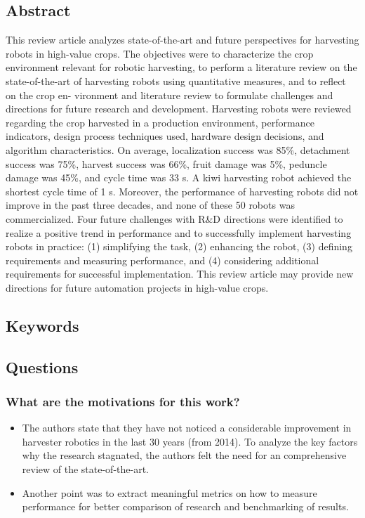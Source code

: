 \documentclass{article}
\begin{document}
\subsection*{Abstract}
This review article analyzes state-of-the-art and future perspectives for harvesting robots in high-value crops.
The objectives were to characterize the crop environment relevant for robotic harvesting, to perform a literature
review on the state-of-the-art of harvesting robots using quantitative measures, and to reflect on the crop en-
vironment and literature review to formulate challenges and directions for future research and development.
Harvesting robots were reviewed regarding the crop harvested in a production environment, performance indicators, design process techniques used, hardware design decisions, and algorithm characteristics. On average,
localization success was 85\%, detachment success was 75\%, harvest success was 66\%, fruit damage was 5\%,
peduncle damage was 45\%, and cycle time was 33 s. A kiwi harvesting robot achieved the shortest cycle time
of 1 s. Moreover, the performance of harvesting robots did not improve in the past three decades, and none
of these 50 robots was commercialized. Four future challenges with R\&D directions were identified to realize
a positive trend in performance and to successfully implement harvesting robots in practice: (1) simplifying
the task, (2) enhancing the robot, (3) defining requirements and measuring performance, and (4) considering
additional requirements for successful implementation. This review article may provide new directions for
future automation projects in high-value crops.
\subsection*{Keywords}

\subsection*{Questions}
\subsubsection*{What are the motivations for this work?}
\begin{itemize}
    \item The authors state that they have not noticed a considerable improvement in harvester robotics in the last 30 years (from 2014). To analyze the key factors why the research stagnated, the authors felt the need for an comprehensive review of the state-of-the-art.
    \item Another point was to extract meaningful metrics on how to measure performance for better comparison of research and benchmarking of results.
\end{itemize}
\end{document}

